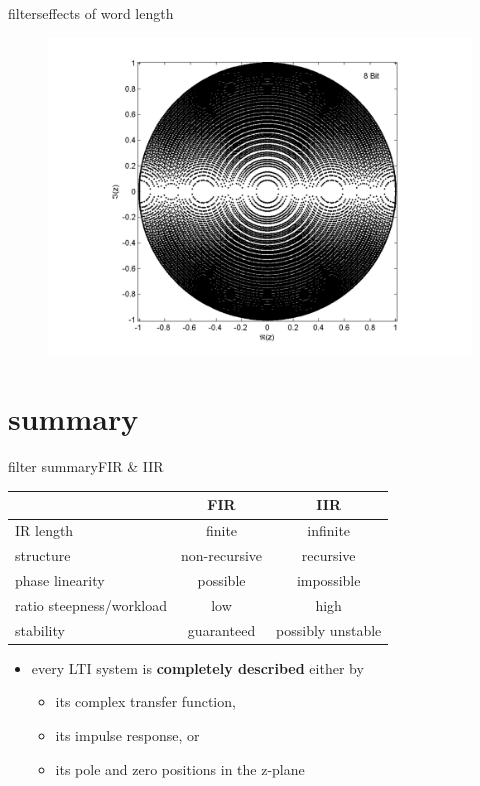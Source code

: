 \begin{frame}{filters}{effects of word length}
{\begin{figure}
\begin{flushright}
						\includegraphics[scale=.35]{graph/QuantPolePlotDirect_4}
					\end{flushright}
				\end{figure}
			}
            \vspace{50mm}
 		\end{frame}
\section{summary}
		\begin{frame}{filter summary}{FIR \& IIR}
            \begin{table}
                \centering
                    \begin{tabular}{l|cc}
                        & \textbf{FIR} & \textbf{IIR}\\
                        \hline
                        IR length & finite & infinite\\
                        structure & non-recursive & recursive\\
                        phase linearity & possible & impossible\\
                        ratio steepness/workload & low & high\\
                        stability & guaranteed & possibly unstable
                    \end{tabular}
            \end{table}
            \bigskip
            \begin{itemize}
                \item   every LTI system is \textbf{completely described} either by
                    \begin{itemize}
                        \item   its complex transfer function,
                        \item   its impulse response, or
                        \item   its pole and zero positions in the z-plane
                    \end{itemize}
            \end{itemize}
 		\end{frame}



